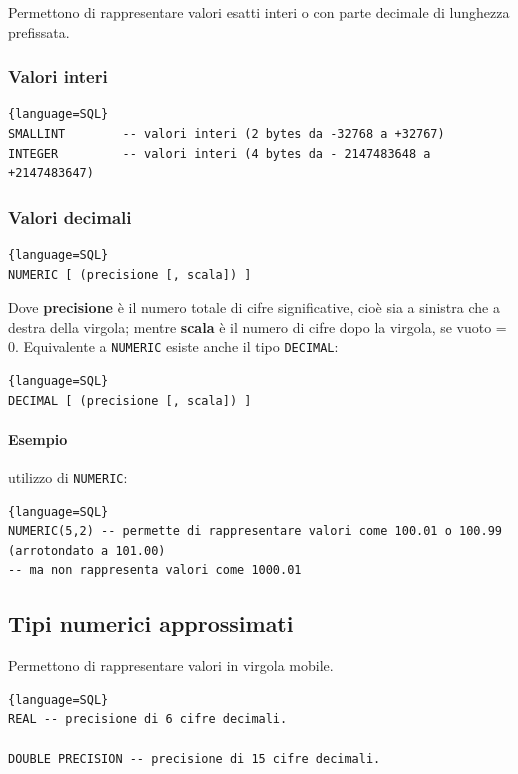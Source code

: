 \documentclass[11pt]{report}
\begin{document}
Permettono di rappresentare valori esatti interi o con parte decimale di lunghezza prefissata.

\subsubsection{Valori interi}

\begin{lstlisting}{language=SQL}
SMALLINT 		-- valori interi (2 bytes da -32768 a +32767)
INTEGER 		-- valori interi (4 bytes da - 2147483648 a +2147483647)
\end{lstlisting}

\subsubsection{Valori decimali}

\begin{lstlisting}{language=SQL}
NUMERIC [ (precisione [, scala]) ]
\end{lstlisting}

Dove \textbf{precisione} \`e il numero totale di cifre significative, cio\`e sia a sinistra che a destra della virgola; mentre \textbf{scala} \`e il numero di cifre dopo la virgola, se vuoto = 0.
Equivalente a \texttt{NUMERIC} esiste anche il tipo \texttt{DECIMAL}:
\begin{lstlisting}{language=SQL}
DECIMAL [ (precisione [, scala]) ]
\end{lstlisting}

\paragraph{Esempio} utilizzo di \texttt{NUMERIC}:
\begin{lstlisting}{language=SQL}
NUMERIC(5,2) -- permette di rappresentare valori come 100.01 o 100.99 (arrotondato a 101.00) 
-- ma non rappresenta valori come 1000.01
\end{lstlisting}

\subsection{Tipi numerici approssimati}

Permettono di rappresentare valori in virgola mobile. \

\begin{lstlisting}{language=SQL}
REAL -- precisione di 6 cifre decimali.

DOUBLE PRECISION -- precisione di 15 cifre decimali.
\end{lstlisting}
\end{document}

